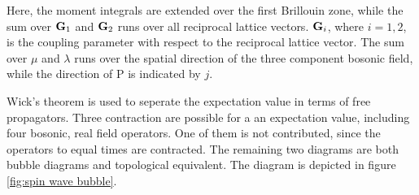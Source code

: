 %
Here, the moment integrals are extended over the first Brillouin zone, while the sum over $\vb{G}_{1}$ and $\vb{G}_{2}$ runs over all reciprocal lattice vectors.
$\vb{G}_{i}$, where $i=1,2$, is the coupling parameter with respect to the reciprocal lattice vector.
The sum over $\mu$ and $\lambda$ runs over the spatial direction of the three component bosonic field, while the direction of P is indicated by $j$.

Wick's theorem is used to seperate the expectation value in terms of free propagators.
Three contraction are possible for a an expectation value, including four bosonic, real field operators.
One of them is not contributed, since the operators to equal times are contracted.
The remaining two diagrams are both bubble diagrams and topological equivalent.
The diagram is depicted in figure \ref{fig:spin wave bubble}.

